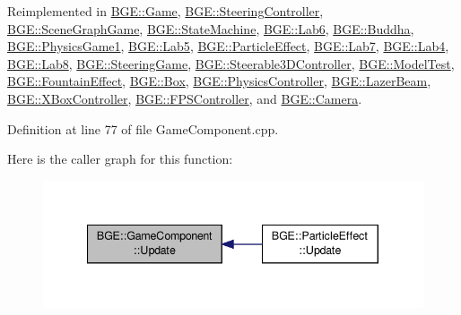 Reimplemented in \hyperlink{class_b_g_e_1_1_game_a51ed573392d7bed791b67062e7c7a3d4}{B\-G\-E\-::\-Game}, \hyperlink{class_b_g_e_1_1_steering_controller_aa0a6fdb7b154d020255e689bae13e592}{B\-G\-E\-::\-Steering\-Controller}, \hyperlink{class_b_g_e_1_1_scene_graph_game_a0da77898a630ba53d2ca512f2992f7fb}{B\-G\-E\-::\-Scene\-Graph\-Game}, \hyperlink{class_b_g_e_1_1_state_machine_a0bbd130dee59706b7d1a9422d922fcfc}{B\-G\-E\-::\-State\-Machine}, \hyperlink{class_b_g_e_1_1_lab6_ace5577edb1f9c38e007f20b843fe1030}{B\-G\-E\-::\-Lab6}, \hyperlink{class_b_g_e_1_1_buddha_a0723abeec23fa78f7d8c830e04c59746}{B\-G\-E\-::\-Buddha}, \hyperlink{class_b_g_e_1_1_physics_game1_ae67a81b2bd9fda6538266bb86b3e37f5}{B\-G\-E\-::\-Physics\-Game1}, \hyperlink{class_b_g_e_1_1_lab5_ae58b0a0640c84a48825a969f8e1396db}{B\-G\-E\-::\-Lab5}, \hyperlink{class_b_g_e_1_1_particle_effect_a648e6935280975de113561bae6f92ee2}{B\-G\-E\-::\-Particle\-Effect}, \hyperlink{class_b_g_e_1_1_lab7_a0e9a409b00ca05c7eeff78cd5aef4f6e}{B\-G\-E\-::\-Lab7}, \hyperlink{class_b_g_e_1_1_lab4_a34fe4d66f91e194a4b129950b4966cfb}{B\-G\-E\-::\-Lab4}, \hyperlink{class_b_g_e_1_1_lab8_abc19add5c6e7fa56977f06c370393be1}{B\-G\-E\-::\-Lab8}, \hyperlink{class_b_g_e_1_1_steering_game_a09cc97712a026e87a229117021998153}{B\-G\-E\-::\-Steering\-Game}, \hyperlink{class_b_g_e_1_1_steerable3_d_controller_a2bb51b669aa98dbed7a5afcc49ed33aa}{B\-G\-E\-::\-Steerable3\-D\-Controller}, \hyperlink{class_b_g_e_1_1_model_test_a27dddd734ca2a9dfd49396707834571b}{B\-G\-E\-::\-Model\-Test}, \hyperlink{class_b_g_e_1_1_fountain_effect_a01d3646a0aa9de6d2036860dccaddf19}{B\-G\-E\-::\-Fountain\-Effect}, \hyperlink{class_b_g_e_1_1_box_acc3f8cdd3607bae6d7f3987ec2361f1b}{B\-G\-E\-::\-Box}, \hyperlink{class_b_g_e_1_1_physics_controller_a1c49abb1bbcd5002b81b2176a41278f0}{B\-G\-E\-::\-Physics\-Controller}, \hyperlink{class_b_g_e_1_1_lazer_beam_a280ca92b029910b173298534d22075d8}{B\-G\-E\-::\-Lazer\-Beam}, \hyperlink{class_b_g_e_1_1_x_box_controller_a5dfebead14f58a9142d4ae7099d9cf2e}{B\-G\-E\-::\-X\-Box\-Controller}, \hyperlink{class_b_g_e_1_1_f_p_s_controller_aeb3dc9b60c65a3f36fbd8c88e2257de3}{B\-G\-E\-::\-F\-P\-S\-Controller}, and \hyperlink{class_b_g_e_1_1_camera_adbf7de12984684cc6277b4fb616d1849}{B\-G\-E\-::\-Camera}.



Definition at line 77 of file Game\-Component.\-cpp.



Here is the caller graph for this function\-:
\nopagebreak
\begin{figure}[H]
\begin{center}
\leavevmode
\includegraphics[width=340pt]{class_b_g_e_1_1_game_component_ac8e444827ee0be9ad654cdff4d15f071_icgraph}
\end{center}
\end{figure}




